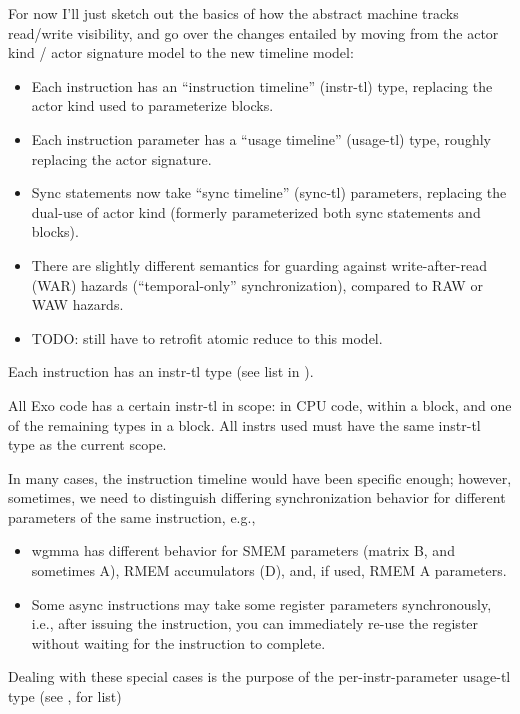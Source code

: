 For now I'll just sketch out the basics of how the abstract machine tracks read/write visibility, and go over the changes entailed by moving from the actor kind / actor signature model to the new timeline model:
\begin{itemize}
  \item Each instruction has an ``instruction timeline'' (instr-tl) type, replacing the actor kind used to parameterize  blocks.
  \filbreak
  \item Each instruction parameter has a ``usage timeline'' (usage-tl) type, roughly replacing the actor signature.
  \filbreak
  \item Sync statements now take ``sync timeline'' (sync-tl) parameters, replacing the dual-use of actor kind (formerly parameterized both sync statements and  blocks).
  \filbreak
  \item There are slightly different semantics for guarding against write-after-read (WAR) hazards (``temporal-only'' synchronization), compared to RAW or WAW hazards.
  \filbreak
  \item TODO: still have to retrofit atomic reduce to this model.
\end{itemize}

\filbreak
{}

Each instruction has an instr-tl type (see list in ).

\filbreak
All Exo code has a certain instr-tl in scope:  in CPU code,  within a  block, and one of the remaining types in a  block.
All instrs used must have the same instr-tl type as the current scope.

\filbreak
{}

In many cases, the instruction timeline would have been specific enough; however, sometimes, we need to distinguish differing synchronization behavior for different parameters of the same instruction, e.g.,
\begin{itemize}
  \item wgmma has different behavior for SMEM parameters (matrix B, and sometimes A), RMEM accumulators (D), and, if used, RMEM A parameters.
  \filbreak
  \item Some async instructions may take some register parameters synchronously, i.e., after issuing the instruction, you can immediately re-use the register without waiting for the instruction to complete.
\end{itemize}
\filbreak
Dealing with these special cases is the purpose of the per-instr-parameter usage-tl type (see , for list)

